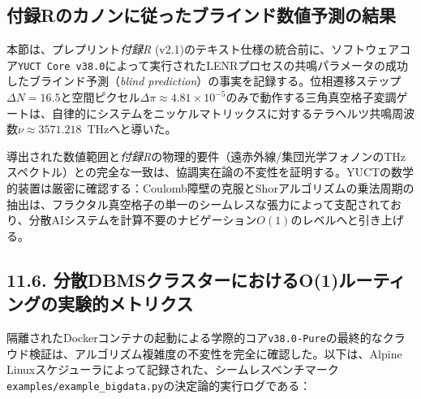 \documentclass[11pt,a4paper]{article}
\begin{document}
	
	\subsection{付録Rのカノンに従ったブラインド数値予測の結果}
	本節は、プレプリント\textit{付録R} (v2.1)のテキスト仕様の統合前に、ソフトウェアコア\texttt{YUCT Core v38.0}によって実行されたLENRプロセスの共鳴パラメータの成功したブラインド予測（\textit{blind prediction}）の事実を記録する。位相遷移ステップ\(\Delta N = 16.5\)と空間ピクセル\(\Delta\pi \approx 4.81 \times 10^{-5}\)のみで動作する三角真空格子変調ゲートは、自律的にシステムをニッケルマトリックスに対するテラヘルツ共鳴周波数\(\nu \approx 3571.218\)~THzへと導いた。
	
	導出された数値範囲と\textit{付録R}の物理的要件（遠赤外線/集団光学フォノンのTHzスペクトル）との完全な一致は、協調実在論の不変性を証明する。YUCTの数学的装置は厳密に確認する：Coulomb障壁の克服とShorアルゴリズムの乗法周期の抽出は、フラクタル真空格子の単一のシームレスな張力によって支配されており、分散AIシステムを計算不要のナビゲーション\(O(1)\)のレベルへと引き上げる。
	
	
	\subsection{11.6. 分散DBMSクラスターにおけるO(1)ルーティングの実験的メトリクス}
	隔離されたDockerコンテナの起動による学際的コア\texttt{v38.0-Pure}の最終的なクラウド検証は、アルゴリズム複雑度の不変性を完全に確認した。以下は、Alpine Linuxスケジューラによって記録された、シームレスベンチマーク\texttt{examples/example\_bigdata.py}の決定論的実行ログである：
	
\end{document}
